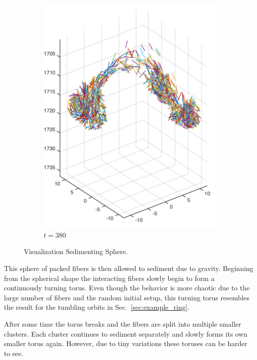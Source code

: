 \begin{figure}[!htbp]
\begin{subfigure}[h]{0.4\textwidth}
    \includegraphics[width=\textwidth]{img/state_00380.pdf}
    \caption{$t=380$}\label{fig:sphere_simulation_1d}
  \end{subfigure}
  \caption{Visualization Sedimenting Sphere.}
  \label{fig:sphere_simulation}
\end{figure}

This sphere of packed fibers is then allowed to sediment due to gravity. Beginning from the spherical shape the interacting fibers slowly begin to form a continuously turning torus. Even though the behavior is more chaotic due to the large number of fibers and the random initial setup, this turning torus resembles the result for the tumbling orbits in Sec.~\ref{sec:example_ring}.

After some time the torus breaks and the fibers are split into multiple smaller clusters. Each cluster continues to sediment separately and slowly forms its own smaller torus again. However, due to tiny variations these toruses can be harder to see.


